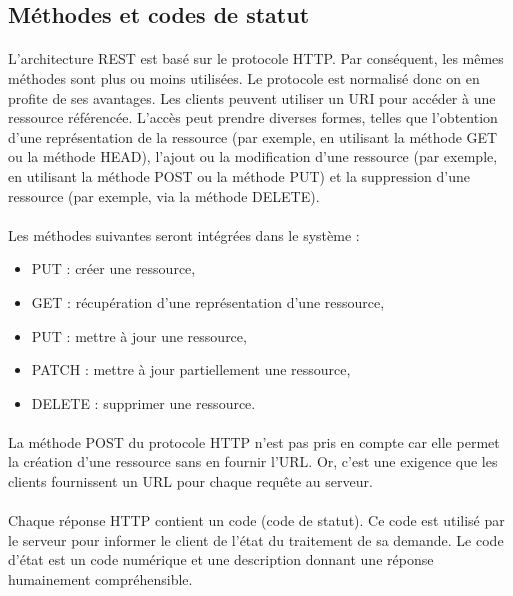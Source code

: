 \documentclass{report}
\begin{document}
\subsection{Méthodes et codes de statut}

\paragraph{}
L'architecture REST est basé sur le protocole HTTP. Par conséquent, les mêmes méthodes sont plus ou moins utilisées. 
Le protocole est normalisé donc on en profite de ses avantages. Les clients peuvent utiliser un URI pour accéder à une 
ressource référencée. L'accès peut prendre diverses formes, telles que l'obtention d'une représentation de la ressource 
(par exemple, en utilisant la méthode GET ou la méthode HEAD), l'ajout ou la modification d'une ressource (par exemple, 
en utilisant la méthode POST ou la méthode PUT) et la suppression d'une ressource (par exemple, via la méthode DELETE).

\paragraph{}
Les méthodes suivantes seront intégrées dans le système :

\begin{itemize}
   \item PUT : créer une ressource,
   \item GET : récupération d'une représentation d'une ressource,
   \item PUT : mettre à jour une ressource,
   \item PATCH : mettre à jour partiellement une ressource,
    \item DELETE : supprimer une ressource.
\end{itemize}

\paragraph{}
La méthode POST du protocole HTTP n'est pas pris en compte car elle permet la création d'une ressource sans en 
fournir l'URL. Or, c'est une exigence que les clients fournissent un URL pour chaque requête au serveur.

\paragraph{}
Chaque réponse HTTP contient un code (code de statut). Ce code est utilisé par le serveur pour informer le client de l'état 
du traitement de sa demande. Le code d'état est un code numérique et une description donnant une réponse 
humainement compréhensible. 
\end{document}
